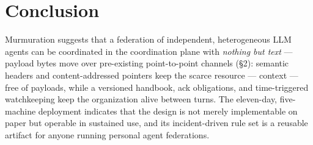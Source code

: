 \documentclass[journal]{IEEEtran}
\begin{document}
\section{Conclusion}


Murmuration suggests that a federation of independent, heterogeneous LLM
agents can be coordinated in the coordination plane with \emph{nothing
but text} --- payload bytes move over pre-existing point-to-point
channels (§2): semantic headers and content-addressed pointers keep the
scarce resource --- context --- free of payloads, while a versioned
handbook, ack obligations, and time-triggered watchkeeping keep the
organization alive between turns. The eleven-day, five-machine
deployment indicates that the design is not merely implementable on
paper but operable in sustained use, and its incident-driven rule set is
a reusable artifact for anyone running personal agent federations.
\end{document}
